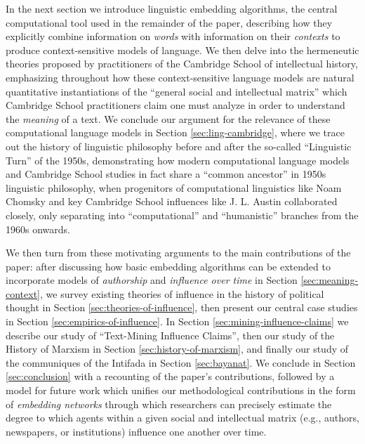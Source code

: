 \documentclass[11pt]{article}
\begin{document}
In the next section we introduce linguistic embedding algorithms, the central computational tool used in the remainder of the paper, describing how they explicitly combine information on \textit{words} with information on their \textit{contexts} to produce context-sensitive models of language. We then delve into the hermeneutic theories proposed by practitioners of the Cambridge School of intellectual history, emphasizing throughout how these context-sensitive language models are natural quantitative instantiations of the ``general social and intellectual matrix'' which Cambridge School practitioners claim one must analyze in order to understand the \textit{meaning} of a text. We conclude our argument for the relevance of these computational language models in Section \ref{sec:ling-cambridge}, where we trace out the history of linguistic philosophy before and after the so-called ``Linguistic Turn'' of the 1950s, demonstrating how modern computational language models and Cambridge School studies in fact share a ``common ancestor'' in 1950s linguistic philosophy, when progenitors of computational linguistics like Noam Chomsky and key Cambridge School influences like J. L. Austin collaborated closely, only separating into ``computational'' and ``humanistic'' branches from the 1960s onwards.

We then turn from these motivating arguments to the main contributions of the paper: after discussing how basic embedding algorithms can be extended to incorporate models of \textit{authorship} and \textit{influence over time} in Section \ref{sec:meaning-context}, we survey existing theories of influence in the history of political thought in Section \ref{sec:theories-of-influence}, then present our central case studies in Section \ref{sec:empirics-of-influence}. In Section \ref{sec:mining-influence-claims} we describe our study of ``Text-Mining Influence Claims'', then our study of the History of Marxism in Section \ref{sec:history-of-marxism}, and finally our study of the communiques of the Intifada in Section \ref{sec:bayanat}. We conclude in Section \ref{sec:conclusion} with a recounting of the paper's contributions, followed by a model for future work which unifies our methodological contributions in the form of \textit{embedding networks} through which researchers can precisely estimate the degree to which agents within a given social and intellectual matrix (e.g., authors, newspapers, or institutions) influence one another over time.

\end{document}
